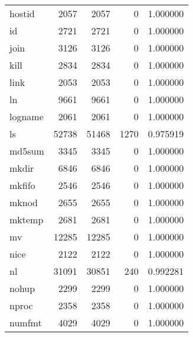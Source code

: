 \begin{longtable}{lrrrr}
hostid    &                     2057 &         2057 &             0 &                 1.000000 \\
id        &                     2721 &         2721 &             0 &                 1.000000 \\
join      &                     3126 &         3126 &             0 &                 1.000000 \\
kill      &                     2834 &         2834 &             0 &                 1.000000 \\
link      &                     2053 &         2053 &             0 &                 1.000000 \\
ln        &                     9661 &         9661 &             0 &                 1.000000 \\
logname   &                     2061 &         2061 &             0 &                 1.000000 \\
ls        &                    52738 &        51468 &          1270 &                 0.975919 \\
md5sum    &                     3345 &         3345 &             0 &                 1.000000 \\
mkdir     &                     6846 &         6846 &             0 &                 1.000000 \\
mkfifo    &                     2546 &         2546 &             0 &                 1.000000 \\
mknod     &                     2655 &         2655 &             0 &                 1.000000 \\
mktemp    &                     2681 &         2681 &             0 &                 1.000000 \\
mv        &                    12285 &        12285 &             0 &                 1.000000 \\
nice      &                     2122 &         2122 &             0 &                 1.000000 \\
nl        &                    31091 &        30851 &           240 &                 0.992281 \\
nohup     &                     2299 &         2299 &             0 &                 1.000000 \\
nproc     &                     2358 &         2358 &             0 &                 1.000000 \\
numfmt    &                     4029 &         4029 &             0 &                 1.000000 \\

\end{longtable}

